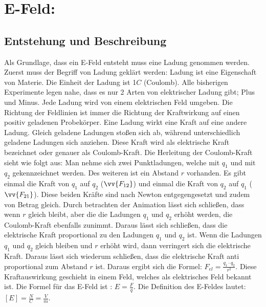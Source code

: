 \section{E-Feld:}
\subsection{Entstehung und Beschreibung}Als Grundlage, dass ein E-Feld entsteht muss eine Ladung genommen werden.
Zuerst muss der Begriff von Ladung geklärt werden:
Ladung ist eine Eigenschaft von Materie.
Die Einheit der Ladung ist 1$C$ (Coulomb).
Alle bisherigen Experimente legen nahe, dass es nur 2 Arten von elektrischer Ladung gibt; Plus und Minus.
Jede Ladung wird von einem elektrischen Feld umgeben.
Die Richtung der Feldlinien ist immer die Richtung der Kraftwirkung auf einen positiv geladenen Probekörper.
Eine Ladung wirkt eine Kraft auf eine andere Ladung.
Gleich geladene Ladungen stoßen sich ab, während unterschiedlich geladene Ladungen sich anziehen.
Diese Kraft wird als elektrische Kraft bezeichnet oder genauer als Coulomb-Kraft.
Die Herleitung der Coulomb-Kraft sieht wie folgt aus:
Man nehme sich zwei Punktladungen, welche mit $q_1$ und mit $q_2$ gekennzeichnet werden. 
Des weiteren ist ein Abstand $r$ vorhanden.
Es gibt einmal die Kraft von $q_1$ auf $q_2$ ($\vv{F_{12}}$) und einmal die Kraft von $q_2$ auf $q_1$ ($\vv{F_{21}}$).
Diese beiden Kräfte sind nach Newton entgegengesetzt und zudem von Betrag gleich.
Durch betrachten der Animation\cite{Animation} 
lässt sich schließen, dass wenn $r$ gleich bleibt, aber die die Ladungen $q_1$ und $q_2$ erhöht werden, die Coulomb-Kraft ebenfalls zunimmt.
Daraus lässt sich schließen, dass die elektrische Kraft proportional zu den Ladungen $q_1$ und $q_2$ ist. 
Wenn die Ladungen $q_1$ und $q_2$ gleich bleiben und $r$ erhöht wird, dann verringert sich die elektrische Kraft.
Daraus lässt sich wiederum schließen, dass die elektrische Kraft anti proportional zum Abstand $r$ ist.
Daraus ergibt sich die Formel: $F_{el} = \frac{q_1 \cdot q_2}{r^2}$.
Diese Kraftauswirkung geschieht in einem Feld, welches als elektrisches Feld bekannt ist.
Die Formel für das E-Feld ist : $E = \frac{F}{q}$.
Die Definition des E-Feldes lautet: $[E] = \frac{N}{C} = \frac{V}{m}$.


